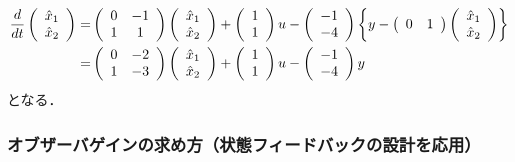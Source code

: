 \begin{align}
 \frac{d}{dt}
 \left(
 \begin{array}{c}
  \hat{x}_1 \\
  \hat{x}_2
 \end{array}
 \right)
 =&
 \left(
 \begin{array}{cc}
  0 & -1 \\
  1 & 1
 \end{array}
 \right)
 \left(
 \begin{array}{c}
  \hat{x}_1 \\
  \hat{x}_2
 \end{array}
 \right) +
 \left(
 \begin{array}{c}
  1 \\
  1
 \end{array}
 \right) u -
  \left(
 \begin{array}{c}
  -1 \\
  -4
 \end{array}
 \right)
\left\{y - 
 \left(
 \begin{array}{cc}
  0 & 1
 \end{array}
 \right)
 \left(
 \begin{array}{c}
  \hat{x}_1 \\
  \hat{x}_2
 \end{array}
 \right)\right\} \notag \\
=& 
 \left(
 \begin{array}{cc}
  0 & -2 \\
  1 & -3
 \end{array}
 \right)
 \left(
 \begin{array}{c}
  \hat{x}_1 \\
  \hat{x}_2
 \end{array}
 \right) +
 \left(
 \begin{array}{c}
  1 \\
  1
 \end{array}
 \right) u -
  \left(
 \begin{array}{c}
  -1 \\
  -4
 \end{array}
 \right)
y
\end{align}
となる．

\subsubsection{オブザーバゲインの求め方（状態フィードバックの設計を応用）}


